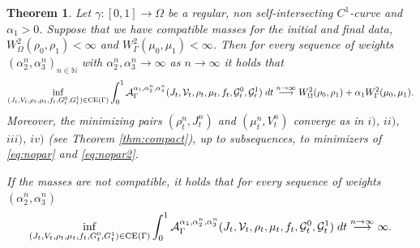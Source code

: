 \documentclass{article}
\def\calA{{\mathcal A}} \def\calB{{\mathcal B}} \def\calC{{\mathcal C}}
\newtheorem{theorem}{Theorem}[section]
\begin{document}
\begin{theorem}
   Let $\gamma:[0,1]\to\Omega$ be a regular, non self-intersecting $C^1$-curve and $\alpha_1>0$. Suppose that we have compatible masses for the initial and final data, $W^2_\Omega(\rho_0,\rho_1) < \infty$ and $W^2_\Gamma(\mu_0,\mu_1) < \infty$. Then for every sequence of weights $(\alpha_2^n,\alpha_3^n)_{n\in\mathbb{N}}$ with $\alpha_2^n, \alpha_3^n\to\infty$ as $n\to\infty$ it holds that 
    \begin{align}\label{eq:thesislimit}
        \inf_{(J_t, V_t, \rho_t, \mu_t, f_t, G_t^0, G_t^1) \in {\rm CE}(\Gamma)}  \int_{0}^{1} \calA_\Gamma^{\alpha_1, \alpha^n_2, \alpha^n_3}(J_t, \mathcal{V}_t, \rho_t, \mu_t, f_t, \mathcal{G}_t^0, \mathcal{G}_t^1)\; dt \overset{n\to\infty}{\longrightarrow} W^2_{\Omega}(\rho_0, \rho_1) + \alpha_1 W^2_\Gamma (\mu_0, \mu_1).
    \end{align}
    Moreover, the minimizing pairs $(\rho^n_t, J^n_t)$ and $(\mu^n_t, V^n_t)$ converge as in $i)$, $ii)$, $iii)$, $iv)$ (see Theorem \ref{thm:compact}), up to subsequences, to minimizers  of \eqref{eq:nopar} and \eqref{eq:nopar2}.
    
If the masses are not compatible, it holds that for every sequence of weights $(\alpha_2^n,\alpha_3^n)$
    \begin{align*}
        \inf_{(J_t, V_t, \rho_t, \mu_t, f_t, G_t^0, G_t^1) \in {\rm CE}(\Gamma)}  \int_{0}^{1} \calA_\Gamma^{\alpha_1, \alpha^n_2, \alpha^n_3}(J_t, \mathcal{V}_t, \rho_t, \mu_t, f_t, \mathcal{G}_t^0, \mathcal{G}_t^1)\; dt\overset{n\to\infty}{\longrightarrow} \infty.
    \end{align*}
\end{theorem}
\end{document}
